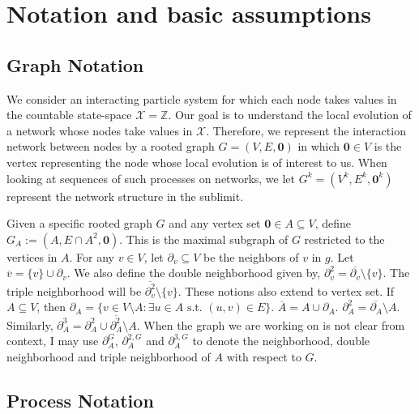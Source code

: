 \documentclass[12pt]{article}
\newcommand{\mb}{\mathbb}
\newcommand{\mc}{\mathcal}
\newcommand{\ov}{\overline}
\newcommand{\te}{\text}
\newcommand{\ind}{\hspace{24pt}}
\newcommand{\defeq}{:=}								%
\newcommand{\sta}{\mc{X}}							%
\newcommand{\neigh}[1]{\partial_{#1}}				%
\newcommand{\dneigh}[1]{\partial^2_{#1}}			%
\newcommand{\tneigh}[1]{\partial^3_{#1}}			%
\newcommand{\gneigh}[2]{\partial^{#1}_{#2}}			%
\newcommand{\dgneigh}[2]{\partial^{2,#1}_{#2}}		%
\newcommand{\tgneigh}[2]{\partial^{3,#1}_{#2}}		%
\newcommand{\cl}[1]{\ov{#1}}						%
\renewcommand{\root}{\mathbf{0}}
\newcommand{\indx}[1]{^{#1}}						%
\newcommand{\subg}[1]{_{#1}}						%
\begin{document}
\section{Notation and basic assumptions}
\label{not}

\subsection{Graph Notation}
\label{g::not}

We consider an interacting particle system for which each node takes values in the countable state-space \(\sta = \mb{Z}\). Our goal is to understand the local evolution of a network whose nodes take values in \(\sta\). Therefore, we represent the interaction network between nodes by a rooted graph \(G = (V,E,\root)\) in which \(\root \in V\) is the vertex representing the node whose local evolution is of interest to us. When looking at sequences of such processes on networks, we let \(G\indx{k} = (V\indx{k},E\indx{k},\root\indx{k})\) represent the network structure in the sublimit.

\ind Given a specific rooted graph \(G\) and any vertex set \(\root \in A \subseteq V\), define \(G\subg{A} \defeq (A,E\cap A^2,\root)\). This is the maximal subgraph of \(G\) restricted to the vertices in \(A\). For any \(v \in V\), let \(\neigh{v}\subseteq V\) be the neighbors of \(v\) in \(g\). Let \(\cl{v} = \{v\}\cup\neigh{v}\). We also define the double neighborhood given by, \(\dneigh{v} = \cl{\neigh{v}}\setminus \{v\}\). The triple neighborhood will be \(\cl{\dneigh{v}} \setminus \{v\}\). These notions also extend to vertex set. If \(A\subseteq V\), then \(\neigh{A} = \{v \in V\setminus A: \exists u \in A\te{ s.t. } (u,v) \in E\}\). \(\cl{A} = A\cup \neigh{A}\). \(\dneigh{A} = \cl{\neigh{A}}\setminus A\). Similarly, \(\tneigh{A} = \dneigh{A} \cup \cl{\dneigh{A}}\setminus A\). When the graph we are working on is not clear from context, I may use \(\gneigh{G}{A}\), \(\dgneigh{G}{A}\) and \(\tgneigh{G}{A}\) to denote the neighborhood, double neighborhood and triple neighborhood of \(A\) with respect to \(G\).

\subsection{Process Notation}
\label{p::not}
\end{document}
